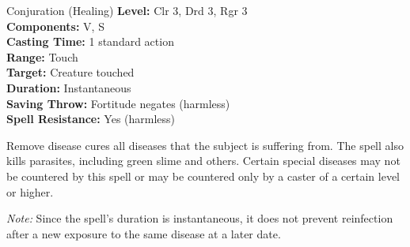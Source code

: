 {Conjuration (Healing)}
{
	\textbf{Level:}
	Clr 3, Drd 3, Rgr 3\\
	\textbf{Components:}
	V, S\\
	\textbf{Casting Time:}
	1 standard action\\
	\textbf{Range:}
	Touch\\
	\textbf{Target:}
	Creature touched\\
	\textbf{Duration:}
	Instantaneous\\
	\textbf{Saving Throw:}
	Fortitude negates (harmless)\\
	\textbf{Spell Resistance:}
	Yes (harmless)\\
}
{
	Remove disease cures all diseases that the subject is suffering from. The spell also kills parasites, including green slime and others. Certain special diseases may not be countered by this spell or may be countered only by a caster of a certain level or higher.

	\textit{Note:} Since the spell's duration is instantaneous, it does not prevent reinfection after a new exposure to the same disease at a later date.

}
